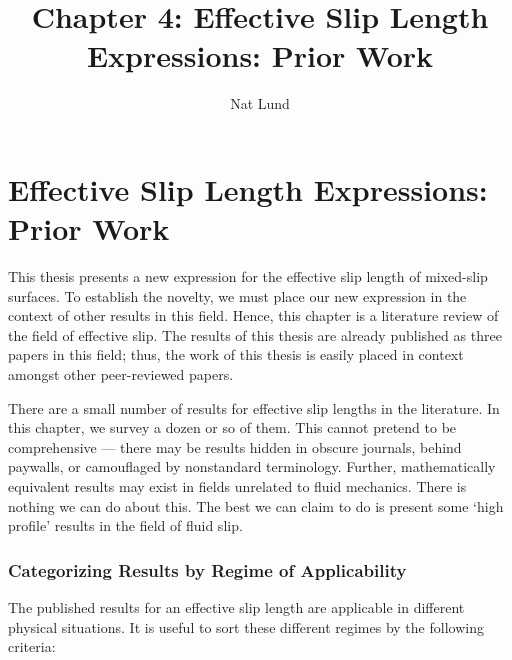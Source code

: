\documentclass[12pt, a4paper, twoside, openright]{book}
\title{Chapter 4: Effective Slip Length Expressions: Prior Work}
\author{Nat Lund}
\begin{document}
\chapter{Effective Slip Length Expressions: Prior Work}\label{C:effslip}

This thesis presents a new expression for the effective slip length of mixed-slip surfaces.  To establish the novelty, we must place our new expression in the context of other results in this field.  Hence, this chapter is a literature review of the field of effective slip.  The results of this thesis are already published as three papers in this field; thus, the work of this thesis is easily placed in context amongst other peer-reviewed papers.

There are a small number of results for effective slip lengths in the literature.  In this chapter, we survey a dozen or so of them.  This cannot pretend to be comprehensive --- there may be results hidden in obscure journals, behind paywalls, or camouflaged by nonstandard terminology.  Further, mathematically equivalent results may exist in fields unrelated to fluid mechanics.  There is nothing we can do about this.  The best we can claim to do is present some `high profile' results in the field of fluid slip.


\subsection{Categorizing Results by Regime of Applicability}

The published results for an effective slip length are applicable in different physical situations.  It is useful to sort these different regimes by the following criteria:
\end{document}
